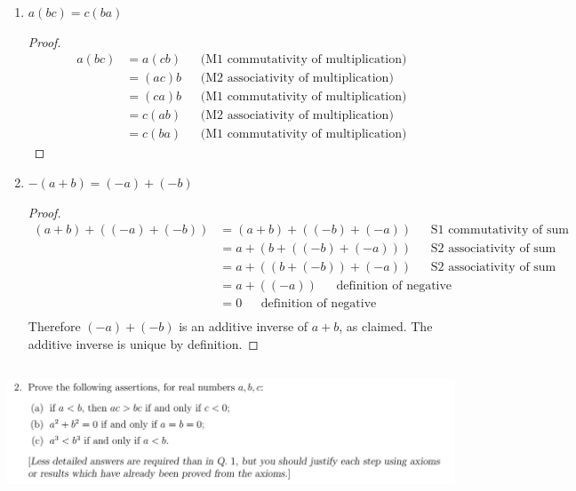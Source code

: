 \documentclass[12pt]{article}
\begin{document}
\begin{enumerate}[label=(\alph*)]
\item \begin{theorem*} $a(bc) = c(ba)$\end{theorem*}
  \begin{proof}
    \begin{align*}
      a(bc) &= a(cb)  ~~~~~~~ \text{(M1 commutativity of multiplication)}\\
            &= (ac)b  ~~~~~~~ \text{(M2 associativity of multiplication)}\\
            &= (ca)b  ~~~~~~~ \text{(M1 commutativity of multiplication)}\\
            &= c(ab)  ~~~~~~~ \text{(M2 associativity of multiplication)}\\
            &= c(ba)  ~~~~~~~ \text{(M1 commutativity of multiplication)}
    \end{align*}
  \end{proof}
\newpage
\item
  \begin{theorem*}
    $-(a + b) = (-a) + (-b)$
  \end{theorem*}
  \begin{proof}
    \begin{align*}
      (a + b) + ((-a) + (-b)) &= (a + b) + ((-b) + (-a)) ~~~~~~~ \text{S1 commutativity of sum}\\
                              &=  a + (b + ((-b) + (-a))) ~~~~~~~ \text{S2 associativity of sum}\\
                              &=  a + ((b + (-b)) + (-a)) ~~~~~~~ \text{S2 associativity of sum}\\
                              &=  a + ((-a)) ~~~~~~~ \text{definition of negative}\\
                              &=  0 ~~~~~~~ \text{definition of negative}\\
    \end{align*}
    Therefore $(-a) + (-b)$ is an additive inverse of $a + b$, as claimed. The additive inverse is
    unique by definition.
  \end{proof}
\end{enumerate}

\newpage
\subsection{}
\begin{mdframed}
  \includegraphics[width=400pt]{img/oxford-prelims-M2-analysis-I-sheet-1-2.png}
\end{mdframed}
\end{document}
